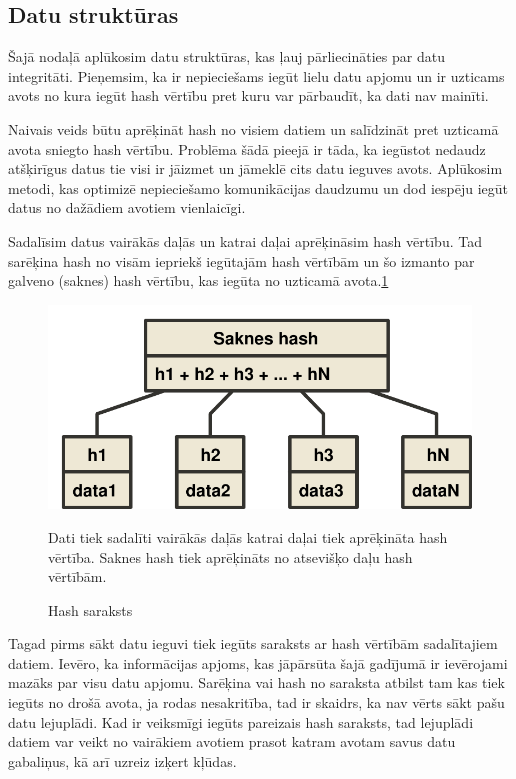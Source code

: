 \subsection{Datu struktūras}
Šajā nodaļā aplūkosim datu struktūras, kas ļauj pārliecināties par datu integritāti. Pieņemsim, ka ir nepieciešams iegūt lielu datu apjomu un ir uzticams avots no kura iegūt hash vērtību pret kuru var pārbaudīt, ka dati nav mainīti. 

Naivais veids būtu aprēķināt hash no visiem datiem un salīdzināt pret uzticamā avota sniegto hash vērtību. Problēma šādā pieejā ir tāda, ka iegūstot nedaudz atšķirīgus datus tie visi ir jāizmet un jāmeklē cits datu ieguves avots. Aplūkosim metodi, kas optimizē nepieciešamo komunikācijas daudzumu un dod iespēju iegūt datus no dažādiem avotiem vienlaicīgi.

Sadalīsim datus vairākās daļās un katrai daļai aprēķināsim hash vērtību. Tad sarēķina hash no visām iepriekš iegūtajām hash vērtībām un šo izmanto par galveno (saknes) hash vērtību, kas iegūta no uzticamā avota.\ref{fig:hash-list} 

\begin{figure}[htpb]
    \centering
    \includegraphics[scale=0.5]{teorija/hash-list.pdf}
    \caption{Hash saraksts}
    Dati tiek sadalīti vairākās daļās katrai daļai tiek aprēķināta hash vērtība. Saknes hash tiek aprēķināts no atsevišķo daļu hash vērtībām.
\label{fig:hash-list}
\end{figure}

Tagad pirms sākt datu ieguvi tiek iegūts saraksts ar hash vērtībām sadalītajiem datiem. Ievēro, ka informācijas apjoms, kas jāpārsūta šajā gadījumā ir ievērojami mazāks par visu datu apjomu. Sarēķina vai hash no saraksta atbilst tam kas tiek iegūts no drošā avota, ja rodas nesakritība, tad ir skaidrs, ka nav vērts sākt pašu datu lejuplādi. Kad ir veiksmīgi iegūts pareizais hash saraksts, tad lejuplādi datiem var veikt no vairākiem avotiem prasot katram avotam savus datu gabaliņus, kā arī uzreiz izķert kļūdas.

